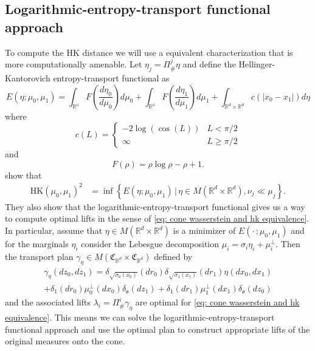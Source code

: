 \documentclass{article}
\begin{document}
\subsection{Logarithmic-entropy-transport functional approach}
To compute the HK distance we will use a equivalent characterization that is more computationally amenable. Let $\eta_j = \Pi^j_\#\eta$ and define the Hellinger-Kantorovich entropy-transport functional as
\begin{equation}
    E(\eta; \mu_0, \mu_1) = \int_{\mathbb{R^d}}F\left(\frac{d\eta_0}{d\mu_0}\right)d\mu_0 + \int_{\mathbb{R^d}}F\left(\frac{d\eta_1}{d\mu_1}\right)d\mu_1 + \int_{\mathbb{R}^d\times \mathbb{R}^d}c(|x_0-x_1|)d\eta
\end{equation}
where
\begin{equation}
    c(L) = \begin{cases}
        -2\log(\cos(L)) & L < \pi/2 \\
        \infty & L \geq \pi/2
    \end{cases}
\end{equation}
and 
\begin{equation}
    F(\rho) = \rho\log\rho - \rho + 1.
\end{equation}
\citet{liero2016optimal} show that 
\begin{align} \label{eq: let hk equivalence}
    \text{HK}(\mu_0, \mu_1)^2 &= \inf\left\{E(\eta;\mu_0, \mu_1) \, |\, \eta  \in M(\mathbb{R}^d\times \mathbb{R}^d), \nu_j  \ll \mu_j\right\}.
\end{align}
They also show that the logarithmic-entropy-transport functional gives us a way to compute optimal lifts in the sense of \cref{eq: cone wasserstein and hk equivalence}. In particular, assume that $\eta \in M(\mathbb{R}^d\times \mathbb{R}^d)$ is a minimizer of $E(\cdot\,; \mu_0, \mu_1)$ and for the marginals $\eta_i$ consider the Lebesgue decomposition $\mu_i = \sigma_i\eta_i + \mu_i^\perp$. Then the transport plan $\gamma_{\eta} \in M(\mathfrak{C}_{\mathbb{R}^d} \times \mathfrak{C}_{\mathbb{R}^d})$ defined by
\begin{multline}
    \gamma_{\eta}(dz_0, dz_1) = \delta_{\sqrt{\sigma_0(x_0)}}(dr_0)\delta_{\sqrt{\sigma_1(x_1)}}(dr_1)\eta(dx_0, dx_1) \\
    + \delta_1(dr_0)\mu_0^\perp(dx_0)\delta_{\mathfrak{o}}(dz_1) + \delta_1(dr_1)\mu_1^\perp(dx_1)\delta_{\mathfrak{o}}(dz_0) 
\end{multline}
and the associated lifts $\lambda_i = \Pi_{\#}^i\gamma_\eta$ are optimal for \cref{eq: cone wasserstein and hk equivalence}. This means we can solve the logarithmic-entropy-transport functional approach and use the optimal plan to construct appropriate lifts of the original measures onto the cone. 
\end{document}
